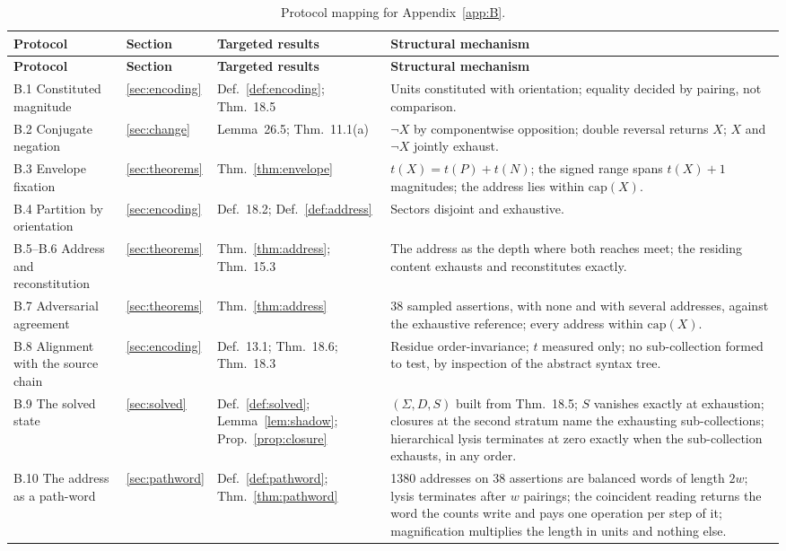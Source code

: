 \documentclass[pdflatex,sn-mathphys-num]{sn-jnl}
\theoremstyle{thmstyleone}%
\theoremstyle{thmstyletwo}%
\theoremstyle{thmstylethree}%
\begin{document}
\begin{appendices}
\begingroup\small\renewcommand{\arraystretch}{1.3}
\begin{longtable}{@{} p{} p{} p{} p{} @{}}
\caption{Protocol mapping for Appendix~\ref{app:B}.}\label{tab:appB_mapping}\\
\toprule
\textbf{Protocol} & \textbf{Section} & \textbf{Targeted results} & \textbf{Structural mechanism} \\
\midrule
\endfirsthead
\toprule
\textbf{Protocol} & \textbf{Section} & \textbf{Targeted results} & \textbf{Structural mechanism} \\
\midrule
\endhead
\bottomrule
\endfoot
B.1 Constituted magnitude & \ref{sec:encoding} & Def.~\ref{def:encoding}; Thm.~18.5 & Units constituted with orientation; equality decided by pairing, not comparison. \\
B.2 Conjugate negation & \ref{sec:change} & Lemma~26.5; Thm.~11.1(a) & $\neg X$ by componentwise opposition; double reversal returns $X$; $X$ and $\neg X$ jointly exhaust. \\
B.3 Envelope fixation & \ref{sec:theorems} & Thm.~\ref{thm:envelope} & $t(X)=t(P)+t(N)$; the signed range spans $t(X)+1$ magnitudes; the address lies within $\mathrm{cap}(X)$. \\
B.4 Partition by orientation & \ref{sec:encoding} & Def.~18.2; Def.~\ref{def:address} & Sectors disjoint and exhaustive. \\
B.5--B.6 Address and reconstitution & \ref{sec:theorems} & Thm.~\ref{thm:address}; Thm.~15.3 & The address as the depth where both reaches meet; the residing content exhausts and reconstitutes exactly. \\
B.7 Adversarial agreement & \ref{sec:theorems} & Thm.~\ref{thm:address} & 38 sampled assertions, with none and with several addresses, against the exhaustive reference; every address within $\mathrm{cap}(X)$. \\
B.8 Alignment with the source chain & \ref{sec:encoding} & Def.~13.1; Thm.~18.6; Thm.~18.3 & Residue order-invariance; $t$ measured only; no sub-collection formed to test, by inspection of the abstract syntax tree. \\
B.9 The solved state & \ref{sec:solved} & Def.~\ref{def:solved}; Lemma~\ref{lem:shadow}; Prop.~\ref{prop:closure} & $(\Sigma,D,S)$ built from Thm.~18.5; $S$ vanishes exactly at exhaustion; closures at the second stratum name the exhausting sub-collections; hierarchical lysis terminates at zero exactly when the sub-collection exhausts, in any order. \\
B.10 The address as a path-word & \ref{sec:pathword} & Def.~\ref{def:pathword}; Thm.~\ref{thm:pathword} & 1380 addresses on 38 assertions are balanced words of length $2w$; lysis terminates after $w$ pairings; the coincident reading returns the word the counts write and pays one operation per step of it; magnification multiplies the length in units and nothing else. \\
\end{longtable}\endgroup


\end{appendices}
\end{document}
